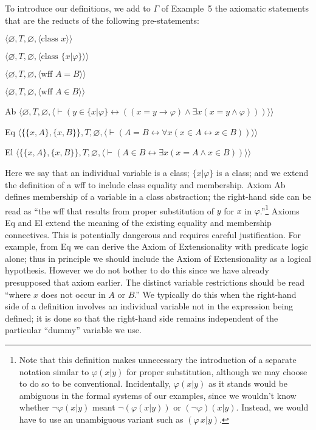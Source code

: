 To
introduce our definitions,
we add to $\Gamma$ of Example~5 the axiomatic statements
that are the reducts of the following pre-statements:
\begin{list}{}{\itemsep 0.0pt}
      \item[] $\langle\varnothing,T,\varnothing,
               \langle \mbox{class\ }x\rangle\rangle$
      \item[] $\langle\varnothing,T,\varnothing,
               \langle \mbox{class\ }\{x|\varphi\}\rangle\rangle$
      \item[] $\langle\varnothing,T,\varnothing,
               \langle \mbox{wff\ }A=B\rangle\rangle$
      \item[] $\langle\varnothing,T,\varnothing,
               \langle \mbox{wff\ }A\in B\rangle\rangle$
      \item[Ab] $\langle\varnothing,T,\varnothing,
               \langle \vdash ( y \in \{ x |\varphi\} \leftrightarrow
                  ( ( x = y \to\varphi) \wedge \exists x ( x = y
                  \wedge\varphi) ))
               \rangle\rangle$
      \item[Eq] $\langle\{\{x,A\},\{x,B\}\},T,\varnothing,
               \langle \vdash ( A = B \leftrightarrow
               \forall x ( x \in A \leftrightarrow x \in B ) )
               \rangle\rangle$
      \item[El] $\langle\{\{x,A\},\{x,B\}\},T,\varnothing,
               \langle \vdash ( A \in B \leftrightarrow \exists x
               ( x = A \wedge x \in B ) )
               \rangle\rangle$
\end{list}
Here we say that an individual variable is a class; $\{x|\varphi\}$ is a
class; and we extend the definition of a wff to include class equality and
membership.  Axiom Ab defines membership of a variable in a class abstraction;
the right-hand side can be read as ``the wff that results from proper
substitution of $y$ for $x$ in $\varphi$.''\footnote{Note that this definition
makes unnecessary the introduction of a separate notation similar to
$\varphi(x|y)$ for proper substitution, although we may choose to do so to be
conventional.  Incidentally, $\varphi(x|y)$ as it stands would be ambiguous in
the formal systems of our examples, since we wouldn't know whether
$\lnot\varphi(x|y)$ meant $\lnot(\varphi(x|y))$ or $(\lnot\varphi)(x|y)$.
Instead, we would have to use an unambiguous variant such as $(\varphi\,
x|y)$.}  Axioms Eq and El extend the meaning of the existing equality and
membership connectives.  This is potentially dangerous and requires careful
justification.  For example, from Eq we can derive the Axiom of Extensionality
with predicate logic alone; thus in principle we should include the Axiom of
Extensionality as a logical hypothesis.  However we do not bother to do this
since we have already presupposed that axiom earlier. The distinct variable
restrictions should be read ``where $x$ does not occur in $A$ or $B$.''  We
typically do this when the right-hand side of a definition involves an
individual variable not in the expression being defined; it is done so that
the right-hand side remains independent of the particular ``dummy'' variable
we use.

